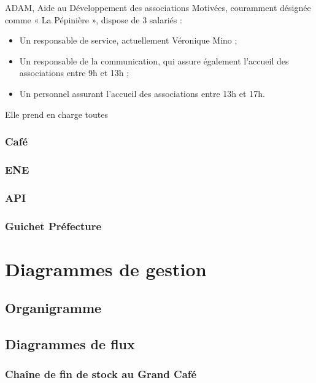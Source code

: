 ADAM, Aide au Développement des associations Motivées, couramment désignée comme « La Pépinière », dispose de 3 salariés :
\begin{itemize}
\item Un responsable de service, actuellement Véronique Mino ;
\item Un responsable de la communication, qui assure également l'accueil des associations entre 9h et 13h ;
\item Un personnel assurant l'accueil des associations entre 13h et 17h.
\end{itemize}

Elle prend en charge toutes

\subsubsection{Café}

\subsubsection{ENE}

\subsubsection{API}

\subsubsection{Guichet Préfecture}

\section{Diagrammes de gestion}
\subsection{Organigramme}

\subsection{Diagrammes de flux}

\subsubsection{Chaîne de fin de stock au Grand Café}

